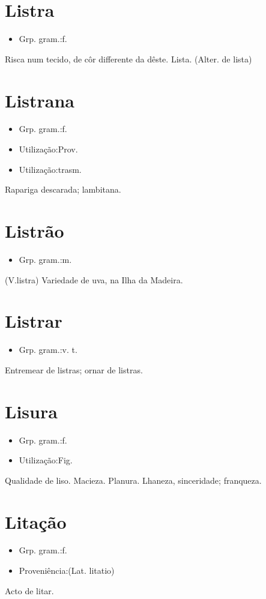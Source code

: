 \section{Listra}
\begin{itemize}
\item {Grp. gram.:f.}
\end{itemize}
Risca num tecido, de côr differente da dêste.
Lista.
(Alter. de \textunderscore lista\textunderscore )
\section{Listrana}
\begin{itemize}
\item {Grp. gram.:f.}
\end{itemize}
\begin{itemize}
\item {Utilização:Prov.}
\end{itemize}
\begin{itemize}
\item {Utilização:trasm.}
\end{itemize}
Rapariga descarada; lambitana.
\section{Listrão}
\begin{itemize}
\item {Grp. gram.:m.}
\end{itemize}
(V.listra)
Variedade de uva, na Ilha da Madeira.
\section{Listrar}
\begin{itemize}
\item {Grp. gram.:v. t.}
\end{itemize}
Entremear de listras; ornar de listras.
\section{Lisura}
\begin{itemize}
\item {Grp. gram.:f.}
\end{itemize}
\begin{itemize}
\item {Utilização:Fig.}
\end{itemize}
Qualidade de liso.
Macieza.
Planura.
Lhaneza, sinceridade; franqueza.
\section{Litação}
\begin{itemize}
\item {Grp. gram.:f.}
\end{itemize}
\begin{itemize}
\item {Proveniência:(Lat. \textunderscore litatio\textunderscore )}
\end{itemize}
Acto de litar.
